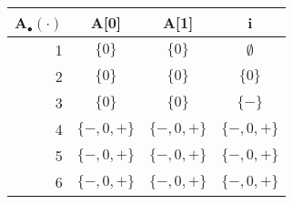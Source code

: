 \begin{table}[H]
\begin{tabular}{| r | c | c | c |}
\hline
A$_\bullet (\cdot) $ & A[0]        & A[1]        & i \\
\hline
1                    & $\{0\}$     & $\{0\} $    & $\emptyset$ \\
2                    & $\{0\}$     & $\{0\} $    & $\{0\}$ \\
3                    & $\{0\}$     & $\{0\} $    & $\{-\}$ \\
4                    & $\{-,0,+\}$ & $\{-,0,+\}$ & $\{-,0,+\}$ \\
5                    & $\{-,0,+\}$ & $\{-,0,+\}$ & $\{-,0,+\}$ \\
6                    & $\{-,0,+\}$ & $\{-,0,+\}$ & $\{-,0,+\}$ \\
\hline
\end{tabular}
\centering
\end{table}
